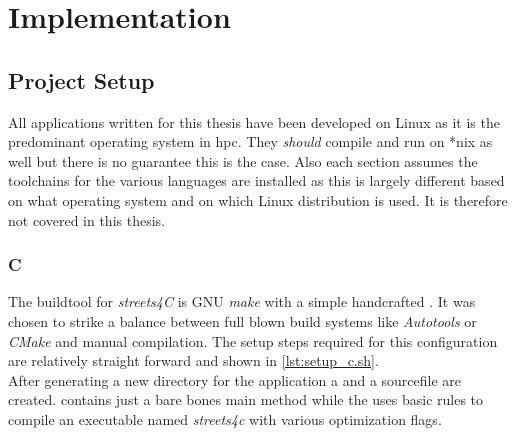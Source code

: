 \chapter{Implementation}
\label{ch:Implementation}


\setcounter{section}{-1}
\section{Project Setup}
\label{sec:Implementation::Setup}

All applications written for this thesis have been developed on Linux as it is the predominant operating system in \gls{hpc}. They \textit{should} compile and run on *nix as well but there is no guarantee this is the case. Also each section assumes the toolchains for the various languages are installed as this is largely different based on what operating system and on which Linux distribution is used. It is therefore not covered in this thesis.

\subsection{C}
\label{subsec:Implementation::Setup::C}

The buildtool for \textit{streets4C} is GNU \textit{make} with a simple handcrafted . It was chosen to strike a balance between full blown build systems like \textit{Autotools} or \textit{CMake} and manual compilation. The setup steps required for this configuration are relatively straight forward and shown in \autoref{lst:setup_c.sh}.
\\


After generating a new directory for the application a  and a sourcefile are created.  contains just a bare bones main method while the  uses basic rules to compile an executable named \textit{streets4c} with various optimization flags.

